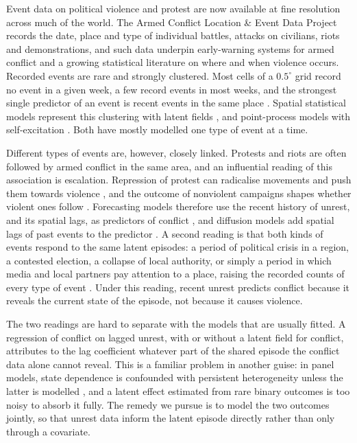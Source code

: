 Event data on political violence and protest are now available at fine resolution
across much of the world. The Armed Conflict Location \& Event Data Project
\citep[ACLED;][]{raleigh2010acled} records the date, place and type of individual
battles, attacks on civilians, riots and demonstrations, and such data underpin
early-warning systems for armed conflict \citep{hegre2019views, hegre2025views} and a
growing statistical literature on where and when violence occurs. Recorded events are
rare and strongly clustered. Most cells of a $0.5^\circ$ grid record no event in a
given week, a few record events in most weeks, and the strongest single predictor of
an event is recent events in the same place \citep{weidmann2010predicting,
mueller2022hard, vestby2022predicting}. Spatial statistical models represent this
clustering with latent fields \citep{zammitmangion2012afghan, python2019bayesian,
python2021predicting, egbon2024spatio}, and point-process models with self-excitation
\citep{mohler2011self, clark2018selfexciting, reinhart2018review}. Both have mostly
modelled one type of event at a time.

Different types of events are, however, closely linked. Protests and riots are often
followed by armed conflict in the same area, and an influential reading of this
association is escalation. Repression of protest can radicalise movements and push
them towards violence \citep{ritter2016preventing, ryckman2020turn, rod2023protest},
and the outcome of nonviolent campaigns shapes whether violent ones follow
\citep{chenoweth2017violent}. Forecasting models therefore use the recent history of
unrest, and its spatial lags, as predictors of conflict \citep{rod2025predicting}, and
diffusion models add spatial lags of past events to the predictor
\citep{buhaug2008contagion, racek2025diffusion}. A second reading is that both kinds of
events respond to the same latent episodes: a period of political crisis in a region,
a contested election, a collapse of local authority, or simply a period in which media
and local partners pay attention to a place, raising the recorded counts of every
type of event \citep{weidmann2016closer, hellmeier2018spotlight, croicu2022reporting}.
Under this reading, recent unrest predicts conflict because it reveals the current
state of the episode, not because it causes violence.

The two readings are hard to separate with the models that are usually fitted.
A regression of conflict on lagged unrest, with or without a latent field for
conflict, attributes to the lag coefficient whatever part of the shared episode the
conflict data alone cannot reveal. This is a familiar problem in another guise: in
panel models, state dependence is confounded with persistent heterogeneity unless the
latter is modelled \citep{heckman1981heterogeneity, wooldridge2005initial}, and a
latent effect estimated from rare binary outcomes is too noisy to absorb it fully. The
remedy we pursue is to model the two outcomes jointly, so that unrest data inform the
latent episode directly rather than only through a covariate.

